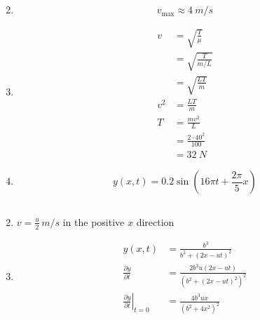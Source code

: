 \documentclass{article}
\begin{document}
\setcounter{subsection}{11}
\subsection{}

\begin{enumerate}
  \setcounter{enumi}{1}
  \item \[v_\text{max} \approx \qty{4}{m/s}\]

  \item

        \begin{align*}
          v   & = \sqrt{\frac{T}{\mu}}     \\
              & = \sqrt{\frac{T}{m / L}}   \\
              & = \sqrt{\frac{L T}{m}}     \\
          v^2 & = \frac{L T}{m}            \\
          T   & = \frac{m v^2}{L}          \\
              & = \frac{2 \cdot 40^2}{100} \\
              & = \qty{32}{N}
        \end{align*}

  \item \[y(x, t) = 0.2 \sin \left( 16 \pi t + \frac{2 \pi}{5} x \right)\]
\end{enumerate}

\subsection{}

\begin{enumerate}
  \setcounter{enumi}{1}
  \item $v = \frac{u}{2} \,\unit{m/s}$ in the positive $x$ direction

  \item

        \begin{align*}
          y(x, t)                                              & = \frac{b^3}{b^2 + (2 x - u t)^2}                     \\
          \frac{\partial y}{\partial t}                        & = \frac{2 b^3 u (2 x - u t)}{(b^2 + (2 x - u t)^2)^2} \\
          \left. \frac{\partial y}{\partial t} \right|_{t = 0} & = \frac{4 b^3 u x}{(b^2 + 4x^2)^2}
        \end{align*}
\end{enumerate}
\end{document}
